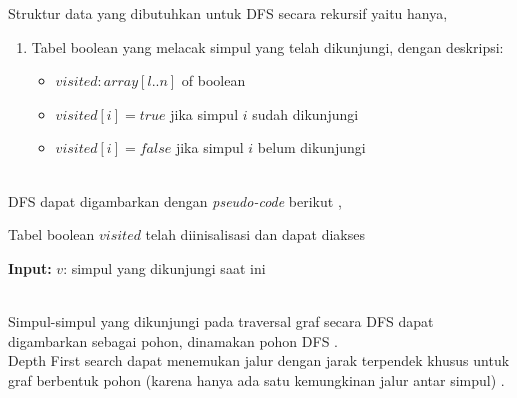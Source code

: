 \documentclass[12pt,a4paper]{article}
\begin{document}
Struktur data yang dibutuhkan untuk DFS secara rekursif yaitu hanya,
\begin{enumerate}
    \item Tabel boolean yang melacak simpul yang telah dikunjungi, dengan deskripsi:
    \begin{itemize}
        \item $visited : array[l..n]$ of boolean
        \item $visited[i] = true$ jika simpul $i$ sudah dikunjungi
        \item $visited[i] = false$ jika simpul $i$ belum dikunjungi
    \end{itemize}
\end{enumerate} \\


DFS dapat digambarkan dengan \textit{pseudo-code} berikut \cite{stima-graph-1},
\begin{algorithm}[H]
    \caption{Mengunjungi seluruh simpul graf dengan DFS} \label{alg:dfs}
    \begin{algorithmic}
        \Require Tabel boolean $visited$ telah diinisalisasi dan dapat diakses
        \Statex

            \State \textbf{Input:} \; $v$: simpul yang dikunjungi saat ini
            \Statex

            \State {} 
                    \State {}
                \EndIf
            \EndFor

        \EndProcedure
    \end{algorithmic}
\end{algorithm} \\

Simpul-simpul yang dikunjungi pada traversal graf secara DFS dapat digambarkan sebagai pohon, dinamakan pohon DFS \cite{stima-graph-1}. \\

Depth First search dapat menemukan jalur dengan jarak terpendek khusus untuk graf berbentuk pohon (karena hanya ada satu kemungkinan jalur antar simpul) \cite{cp-dfs}. \\
\end{document}
